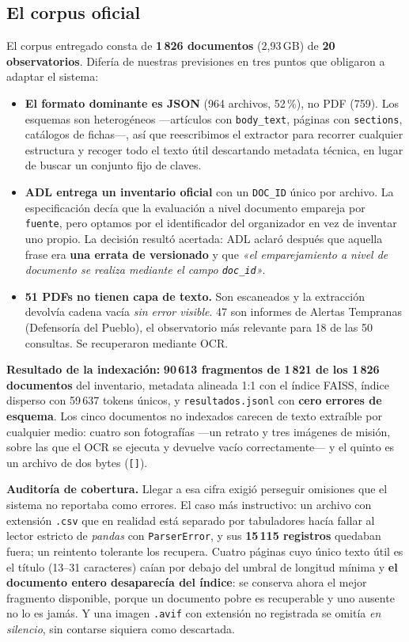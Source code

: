 \documentclass[10pt,a4paper]{article}
\begin{document}
\subsection{El corpus oficial}

El corpus entregado consta de \textbf{1\,826 documentos} (2,93\,GB) de \textbf{20 observatorios}.
Difería de nuestras previsiones en tres puntos que obligaron a adaptar el sistema:

\begin{itemize}
\item \textbf{El formato dominante es JSON} (964 archivos, 52\,\%), no PDF (759). Los esquemas son
heterogéneos —artículos con \texttt{body\_text}, páginas con \texttt{sections}, catálogos de
fichas—, así que reescribimos el extractor para recorrer cualquier estructura y recoger todo el
texto útil descartando metadata técnica, en lugar de buscar un conjunto fijo de claves.
\item \textbf{ADL entrega un inventario oficial} con un \texttt{DOC\_ID} único por archivo. La
especificación decía que la evaluación a nivel documento empareja por \texttt{fuente}, pero
optamos por el identificador del organizador en vez de inventar uno propio. La decisión resultó
acertada: ADL aclaró después que aquella frase era \textbf{una errata de versionado} y que
\emph{«el emparejamiento a nivel de documento se realiza mediante el campo \texttt{doc\_id}»}.
\item \textbf{51 PDFs no tienen capa de texto.} Son escaneados y la extracción devolvía cadena
vacía \emph{sin error visible}. 47 son informes de Alertas Tempranas (Defensoría del Pueblo), el
observatorio más relevante para 18 de las 50 consultas. Se recuperaron mediante OCR.
\end{itemize}

\textbf{Resultado de la indexación:} \textbf{90\,613 fragmentos de 1\,821 de los 1\,826 documentos}
del inventario, metadata alineada 1:1 con el índice FAISS, índice disperso con 59\,637 tokens
únicos, y \texttt{resultados.jsonl} con \textbf{cero errores de esquema}. Los cinco documentos no
indexados carecen de texto extraíble por cualquier medio: cuatro son fotografías —un retrato y
tres imágenes de misión, sobre las que el OCR se ejecuta y devuelve vacío correctamente— y el
quinto es un archivo de dos bytes (\texttt{[]}).

\textbf{Auditoría de cobertura.} Llegar a esa cifra exigió perseguir omisiones que el sistema no
reportaba como errores. El caso más instructivo: un archivo con extensión \texttt{.csv} que en
realidad está separado por tabuladores hacía fallar al lector estricto de \emph{pandas} con
\texttt{ParserError}, y sus \textbf{15\,115 registros} quedaban fuera; un reintento tolerante los
recupera. Cuatro páginas cuyo único texto útil es el título (13--31 caracteres) caían por debajo
del umbral de longitud mínima y \textbf{el documento entero desaparecía del índice}: se conserva
ahora el mejor fragmento disponible, porque un documento pobre es recuperable y uno ausente no lo
es jamás. Y una imagen \texttt{.avif} con extensión no registrada se omitía \emph{en silencio}, sin
contarse siquiera como descartada.
\end{document}
